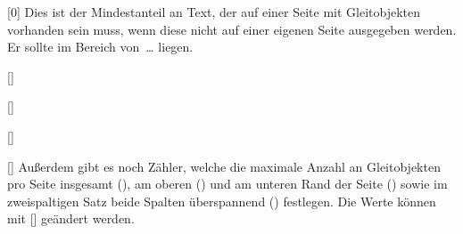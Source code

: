 \begin{Declaration}{}[0\textfraction]
\printdeclarationlist%
%
Dies ist der Mindestanteil an Text, der auf einer Seite mit Gleitobjekten 
vorhanden sein muss, wenn diese nicht auf einer eigenen Seite ausgegeben 
werden. Er sollte im Bereich von~\dots{} liegen.
\end{Declaration}

\begin{Declaration}{}[]
\begin{Declaration}{}[]
\begin{Declaration}{}[]
\begin{Declaration}{}[]
\printdeclarationlist%
%
Außerdem gibt es noch Zähler, welche die maximale Anzahl an Gleitobjekten pro 
Seite insgesamt (), am oberen () und 
am unteren Rand der Seite () sowie im zweispaltigen Satz
beide Spalten überspannend () festlegen. Die Werte 
können mit [] geändert 
werden.
\end{Declaration}
\end{Declaration}
\end{Declaration}
\end{Declaration}

